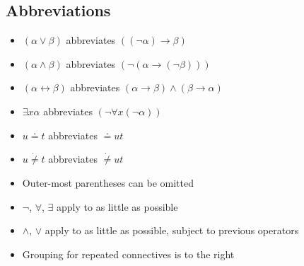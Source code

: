 \subsection{Abbreviations}

\begin{itemize}
    \item $(\alpha\vee\beta)$ abbreviates $((\neg\alpha)\to\beta)$
    \item $(\alpha\wedge\beta)$ abbreviates $(\neg(\alpha \to (\neg\beta)))$
    \item $(\alpha\leftrightarrow\beta)$ abbreviates $(\alpha\to\beta)\wedge(\beta\to\alpha)$
    \item $\exists x\alpha$ abbreviates $(\neg\forall x(\neg\alpha))$
    \item $u\doteq t$ abbreviates $\doteq ut$
    \item $u \dot{\neq} t$ abbreviates $\dot{\neq} ut$
    \item Outer-most parentheses can be omitted
    \item $\neg$, $\forall$, $\exists$ apply to as little as possible
    \item $\wedge$, $\vee$ apply to as little as possible, subject to previous operators
    \item Grouping for repeated connectives is to the right
\end{itemize}